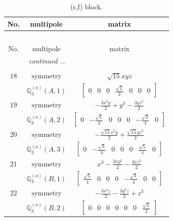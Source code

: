 \documentclass[fleqn,8pt,landscape]{jsarticle}
\begin{document}
\begin{longtable}{ccc}
\caption{(s,f) block.}
 \\
 \hline \hline
No. & multipole & matrix \\ \hline \endfirsthead

\multicolumn{2}{l}{\tablename\ \thetable{}} \\
 \hline \hline
No. & multipole & matrix \\ \hline \endhead

 \hline \hline
\multicolumn{2}{r}{\footnotesize\it continued ...} \\ \endfoot

 \hline \hline
\multicolumn{2}{r}{} \\ \endlastfoot

$ 18 $ & $ \text{symmetry} $ & $ \sqrt{15} x y z $ \\
$  $ & $ \mathbb{Q}_{3}^{(a)}(A,1) $ & $ \begin{bmatrix} 0 & 0 & 0 & \frac{\sqrt{2}}{2} & 0 & 0 & 0 \end{bmatrix} $ \\ \hline
$ 19 $ & $ \text{symmetry} $ & $ - \frac{3 x^{2} y}{2} + y^{3} - \frac{3 y z^{2}}{2} $ \\
$  $ & $ \mathbb{Q}_{3}^{(a)}(A,2) $ & $ \begin{bmatrix} 0 & - \frac{\sqrt{5}}{4} & 0 & 0 & 0 & - \frac{\sqrt{3}}{4} & 0 \end{bmatrix} $ \\ \hline
$ 20 $ & $ \text{symmetry} $ & $ - \frac{\sqrt{15} x^{2} y}{2} + \frac{\sqrt{15} y z^{2}}{2} $ \\
$  $ & $ \mathbb{Q}_{3}^{(a)}(A,3) $ & $ \begin{bmatrix} 0 & - \frac{\sqrt{3}}{4} & 0 & 0 & 0 & \frac{\sqrt{5}}{4} & 0 \end{bmatrix} $ \\ \hline
$ 21 $ & $ \text{symmetry} $ & $ x^{3} - \frac{3 x y^{2}}{2} - \frac{3 x z^{2}}{2} $ \\
$  $ & $ \mathbb{Q}_{3}^{(a)}(B,1) $ & $ \begin{bmatrix} \frac{\sqrt{5}}{4} & 0 & 0 & 0 & - \frac{\sqrt{3}}{4} & 0 & 0 \end{bmatrix} $ \\ \hline
$ 22 $ & $ \text{symmetry} $ & $ - \frac{3 x^{2} z}{2} - \frac{3 y^{2} z}{2} + z^{3} $ \\
$  $ & $ \mathbb{Q}_{3}^{(a)}(B,2) $ & $ \begin{bmatrix} 0 & 0 & 0 & 0 & 0 & 0 & \frac{\sqrt{2}}{2} \end{bmatrix} $ \\ \hline

\end{longtable}
\end{document}

